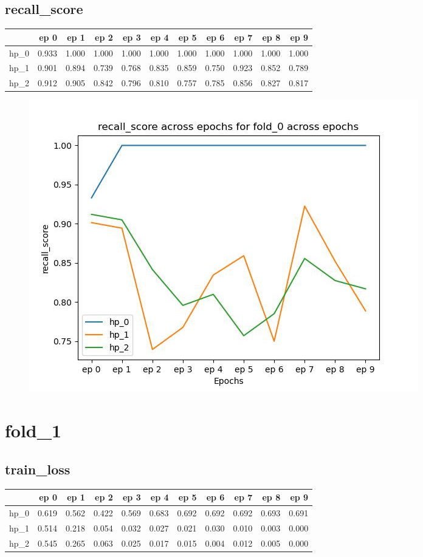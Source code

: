 \documentclass{article}
\begin{document}
\subsection{recall\_score}
\begin{tabular}{lrrrrrrrrrr}
\toprule
{} &   ep 0 &   ep 1 &   ep 2 &   ep 3 &   ep 4 &   ep 5 &   ep 6 &   ep 7 &   ep 8 &   ep 9 \\
\midrule
hp\_0 &  0.933 &  1.000 &  1.000 &  1.000 &  1.000 &  1.000 &  1.000 &  1.000 &  1.000 &  1.000 \\
hp\_1 &  0.901 &  0.894 &  0.739 &  0.768 &  0.835 &  0.859 &  0.750 &  0.923 &  0.852 &  0.789 \\
hp\_2 &  0.912 &  0.905 &  0.842 &  0.796 &  0.810 &  0.757 &  0.785 &  0.856 &  0.827 &  0.817 \\
\bottomrule
\end{tabular}

\begin{figure}[H]
\includegraphics[scale = 0.75]{fold_0/recall_score}
\end{figure}
\section{fold\_1}
\subsection{train\_loss}
\begin{tabular}{lrrrrrrrrrr}
\toprule
{} &   ep 0 &   ep 1 &   ep 2 &   ep 3 &   ep 4 &   ep 5 &   ep 6 &   ep 7 &   ep 8 &   ep 9 \\
\midrule
hp\_0 &  0.619 &  0.562 &  0.422 &  0.569 &  0.683 &  0.692 &  0.692 &  0.692 &  0.693 &  0.691 \\
hp\_1 &  0.514 &  0.218 &  0.054 &  0.032 &  0.027 &  0.021 &  0.030 &  0.010 &  0.003 &  0.000 \\
hp\_2 &  0.545 &  0.265 &  0.063 &  0.025 &  0.017 &  0.015 &  0.004 &  0.012 &  0.005 &  0.000 \\
\bottomrule
\end{tabular}
\end{document}
